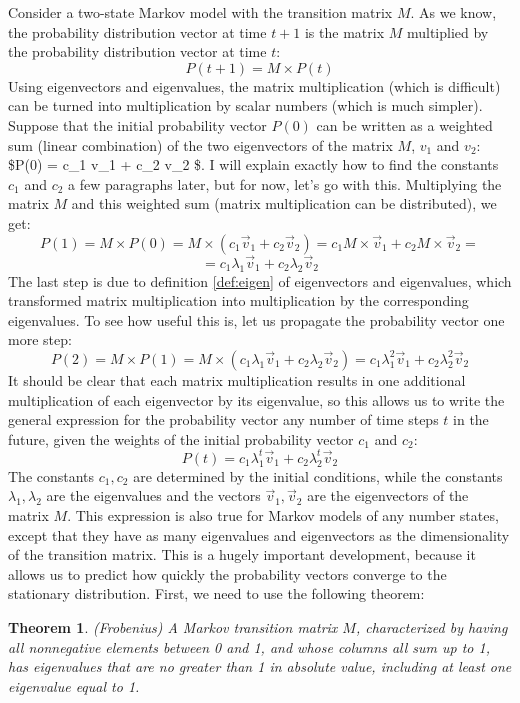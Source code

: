 \documentclass[
]{book}
\newtheorem{theorem}{Theorem}[chapter]
\theoremstyle{definition}
\theoremstyle{definition}
\theoremstyle{definition}
\theoremstyle{remark}
\begin{document}
Consider a two-state Markov model with the transition matrix \(M\). As we know, the probability distribution vector at time \(t+1\) is the matrix \(M\) multiplied by the probability distribution vector at time \(t\):
\[ P(t+1) = M \times P(t) \]
Using eigenvectors and eigenvalues, the matrix multiplication (which is difficult) can be turned into multiplication by scalar numbers (which is much simpler). Suppose that the initial probability vector \(P(0)\) can be written as a weighted sum (linear combination) of the two eigenvectors of the matrix \(M\), \(v_1\) and \(v_2\): \$P(0) = c\_1 \vec v\_1 + c\_2 \vec v\_2 \$. I will explain exactly how to find the constants \(c_1\) and \(c_2\) a few paragraphs later, but for now, let's go with this. Multiplying the matrix \(M\) and this weighted sum (matrix multiplication can be distributed), we get:
\[ P(1) = M \times P(0) =  M \times (c_1 \vec v_1 + c_2 \vec v_2) = c_1 M \times \vec v_1 + c_2 M \times  \vec v_2  =  \]
\[ = c_1 \lambda_1\vec v_1 + c_2 \lambda_2 \vec v_2 \]
The last step is due to definition \ref{def:eigen} of eigenvectors and eigenvalues, which transformed matrix multiplication into multiplication by the corresponding eigenvalues. To see how useful this is, let us propagate the probability vector one more step:
\[ P(2) = M \times P(1) =  M \times ( c_1 \lambda_1\vec v_1 + c_2 \lambda_2 \vec v_2) =  c_1 \lambda_1^2\vec v_1 + c_2 \lambda_2^2 \vec v_2 \]
It should be clear that each matrix multiplication results in one additional multiplication of each eigenvector by its eigenvalue, so this allows us to write the general expression for the probability vector any number of time steps \(t\) in the future, given the weights of the initial probability vector \(c_1\) and \(c_2\):
\[ P(t) =c_1 \lambda_1^t \vec v_1 +c_2 \lambda_2^t \vec v_2  \]
The constants \(c_1, c_2\) are determined by the initial conditions, while the constants \(\lambda_1, \lambda_2\) are the eigenvalues and the vectors \(\vec v_1, \vec v_2\) are the eigenvectors of the matrix \(M\). This expression is also true for Markov models of any number states, except that they have as many eigenvalues and eigenvectors as the dimensionality of the transition matrix. This is a hugely important development, because it allows us to predict how quickly the probability vectors converge to the stationary distribution. First, we need to use the following theorem:

\begin{theorem}
\protect\hypertarget{thm:theo-frob}{}{\label{thm:theo-frob} }(Frobenius) A Markov transition matrix \(M\), characterized by having all nonnegative elements between 0 and 1, and whose columns all sum up to 1, has eigenvalues that are no greater than 1 in absolute value, including at least one eigenvalue equal to 1.
\end{theorem}
\end{document}
